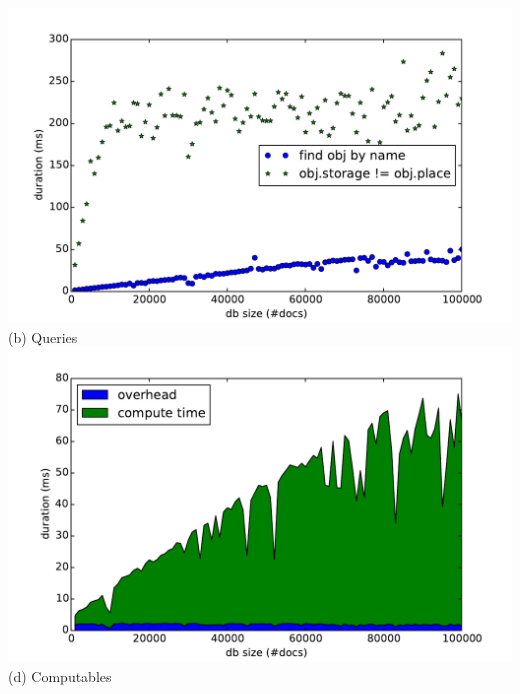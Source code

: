 \begin{frame}
\begin{columns}
\begin{column}{0.55\textwidth}
    \includegraphics[width=\textwidth]{../thesis/plots/query-durations}\\
    (b) Queries
    \\\vspace{-0.08cm}
    \includegraphics[width=\textwidth]{../thesis/plots/computable-durations}\\
    (d) Computables
    \end{column}
  \end{columns}
\end{frame}

